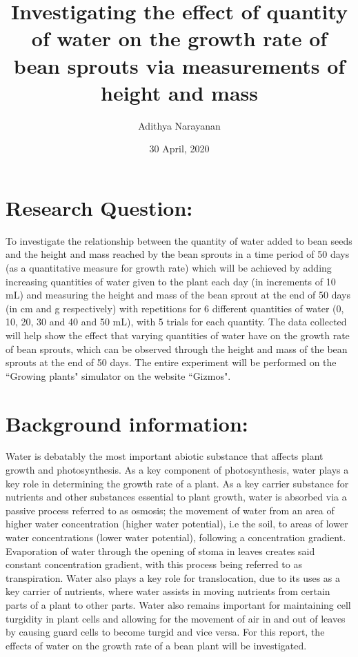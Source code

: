 \documentclass[11pt, a4]{article}
\title{\vspace{90mm}Investigating the effect of quantity of water on the growth rate of bean sprouts via measurements of height and mass}
\author{Adithya Narayanan}
\date{30 April, 2020}
\begin{document}
	\begin{titlepage}
		\maketitle
		\thispagestyle{empty}
	\end{titlepage}
	\tableofcontents
	\thispagestyle{empty}
	\newpage
	\clearpage
	\setcounter{page}{1}
	\section{Research Question:}
	To investigate the relationship between the quantity of water added to bean seeds and the height and mass reached by the bean sprouts in a time period of 50 days (as a quantitative measure for growth rate) which will be achieved by adding increasing quantities of water given to the plant each day (in increments of 10 mL) and measuring the height and mass of the bean sprout at the end of 50 days (in cm and g respectively) with repetitions for 6 different quantities of water (0, 10, 20, 30 and 40 and 50 mL), with 5 trials for each quantity. The data collected will help show the effect that varying quantities of water have on the growth rate of bean sprouts, which can be observed through the height and mass of the bean sprouts at the end of 50 days. The entire experiment will be performed on the ``Growing plants" simulator on the website ``Gizmos".
	\section{Background information:}
		Water is debatably the most important abiotic substance that affects plant growth and photosynthesis. As a key component of photosynthesis, water plays a key role in determining the growth rate of a plant. As a key carrier substance for nutrients and other substances essential to plant growth, water is absorbed via a passive process referred to as osmosis; the movement of water from an area of higher water concentration (higher water potential), i.e the soil, to areas of lower water concentrations (lower water potential), following a concentration gradient. Evaporation of water through the opening of stoma in leaves creates said constant concentration gradient, with this process being referred to as transpiration. Water also plays a key role for translocation, due to its uses as a key carrier of nutrients, where water assists in moving nutrients from certain parts of a plant to other parts. Water also remains important for maintaining cell turgidity in plant cells and allowing for the movement of air in and out of leaves by causing guard cells to become turgid and vice versa. For this report, the effects of water on the growth rate of a bean plant will be investigated.
\end{document}
